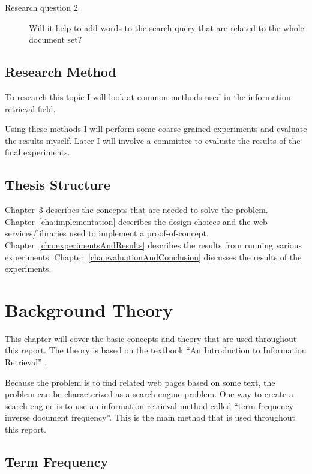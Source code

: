 \documentclass[a4paper]{book}
\begin{document}
\begin{description}
\item[Research question 2]
Will it help to add words to the search query that are related to the whole document set?
\end{description}

\section{Research Method}
\label{sec:researchMethod}

To research this topic I will look at common methods used in the information retrieval field.

Using these methods I will perform some coarse-grained experiments and evaluate the results myself. Later I will involve a committee to evaluate the results of the final experiments.

\section{Thesis Structure}
\label{sec:thesisStructure}

Chapter~\ref{cha:backgroundTheory} describes the concepts that are needed to solve the problem. Chapter~\ref{cha:implementation} describes the design choices and the web services/libraries used to implement a proof-of-concept. Chapter~\ref{cha:experimentsAndResults} describes the results from running various experiments. Chapter~\ref{cha:evaluationAndConclusion} discusses the results of the experiments.

\chapter{Background Theory}
\label{cha:backgroundTheory}

This chapter will cover the basic concepts and theory that are used throughout this report. The theory is based on the textbook ``An Introduction to Information Retrieval'' \cite{introToIR}.

Because the problem is to find related web pages based on some text, the problem can be characterized as a search engine problem. One way to create a search engine is to use an information retrieval method called ``term frequency--inverse document frequency''. This is the main method that is used throughout this report.

\section{Term Frequency}
\label{sec:termFrequency}
\end{document}
